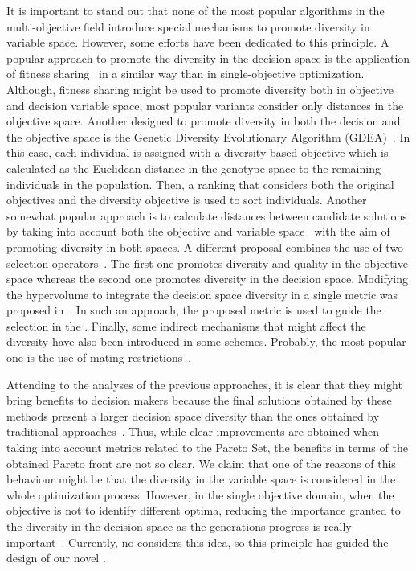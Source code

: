 It is important to stand out that none of the most popular algorithms in the multi-objective field introduce special 
mechanisms to promote diversity in variable space.
%
However, some efforts have been dedicated to this principle.
%
A popular approach to promote the diversity in the decision space is the application of fitness sharing~\cite{Joel:NPGA} 
in a similar way than in single-objective optimization.
%
Although, fitness sharing might be used to promote diversity both in objective and decision variable space, most
popular variants consider only distances in the objective space.
%
Another \MOEA{} designed to promote diversity in both the decision and the objective space is the Genetic
Diversity Evolutionary Algorithm (GDEA)~\cite{toffolo2003genetic}.
%
In this case, each individual is assigned with a diversity-based objective which is calculated as the
Euclidean distance in the genotype space to the remaining individuals in the population.
%
Then, a ranking that considers both the original objectives and the diversity objective is used
to sort individuals.
%
Another somewhat popular approach is to calculate distances between candidate solutions by taking
into account both the objective and variable space~\cite{deb2005omni,shir2009enhancing} with the aim
of promoting diversity in both spaces.
%
A different proposal combines the use of two selection operators~\cite{chan2005evolutionary}.
%
The first one promotes diversity and quality in the objective space whereas the second one promotes diversity in the decision space.
%
Modifying the hypervolume to integrate the decision space diversity in a single metric was proposed in~\cite{ulrich2010integrating}.
%
In such an approach, the proposed metric is used to guide the selection in the \MOEA{}.
%
Finally, some indirect mechanisms that might affect the diversity have also been introduced in some schemes.
%
Probably, the most popular one is the use of mating restrictions~\cite{Joel:STUDY_MATTING_RESTRICTION,Joel:MOEAD_AMS}.

Attending to the analyses of the previous approaches, it is clear that they might bring benefits to decision makers
because the final solutions obtained by these methods present a larger decision space diversity than the ones obtained
by traditional approaches~\cite{deb2005omni, rudolph2007capabilities}.
%
Thus, while clear improvements are obtained when taking into account metrics related to the Pareto Set, the benefits in terms of the 
obtained Pareto front are not so clear.
%
We claim that one of the reasons of this behaviour might be that the diversity in the variable space is considered 
in the whole optimization process.
%
However, in the single objective domain, when the objective is not to identify different optima,
reducing the importance granted to the diversity in the decision space as the generations progress 
is really important~\cite{Joel:MULTI_DYNAMIC}.
%
Currently, no \MOEA{} considers this idea, so this principle has guided the design of our novel \MOEA{}.
